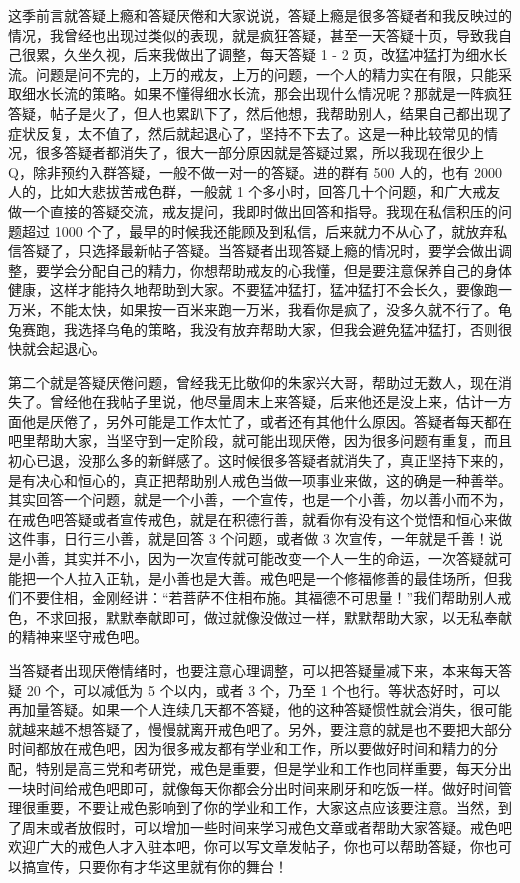 \documentclass{ctexart}
\begin{document}
这季前言就答疑上瘾和答疑厌倦和大家说说，答疑上瘾是很多答疑者和我反映过的情况，我曾经也出现过类似的表现，就是疯狂答疑，甚至一天答疑十页，导致我自己很累，久坐久视，后来我做出了调整，每天答疑 1 - 2 页，改猛冲猛打为细水长流。问题是问不完的，上万的戒友，上万的问题，一个人的精力实在有限，只能采取细水长流的策略。如果不懂得细水长流，那会出现什么情况呢？那就是一阵疯狂答疑，帖子是火了，但人也累趴下了，然后他想，我帮助别人，结果自己都出现了症状反复，太不值了，然后就起退心了，坚持不下去了。这是一种比较常见的情况，很多答疑者都消失了，很大一部分原因就是答疑过累，所以我现在很少上 Q，除非预约入群答疑，一般不做一对一的答疑。进的群有 500 人的，也有 2000 人的，比如大悲拔苦戒色群，一般就 1 个多小时，回答几十个问题，和广大戒友做一个直接的答疑交流，戒友提问，我即时做出回答和指导。我现在私信积压的问题超过 1000 个了，最早的时候我还能顾及到私信，后来就力不从心了，就放弃私信答疑了，只选择最新帖子答疑。当答疑者出现答疑上瘾的情况时，要学会做出调整，要学会分配自己的精力，你想帮助戒友的心我懂，但是要注意保养自己的身体健康，这样才能持久地帮助到大家。不要猛冲猛打，猛冲猛打不会长久，要像跑一万米，不能太快，如果按一百米来跑一万米，我看你是疯了，没多久就不行了。龟兔赛跑，我选择乌龟的策略，我没有放弃帮助大家，但我会避免猛冲猛打，否则很快就会起退心。

第二个就是答疑厌倦问题，曾经我无比敬仰的朱家兴大哥，帮助过无数人，现在消失了。曾经他在我帖子里说，他尽量周末上来答疑，后来他还是没上来，估计一方面他是厌倦了，另外可能是工作太忙了，或者还有其他什么原因。答疑者每天都在吧里帮助大家，当坚守到一定阶段，就可能出现厌倦，因为很多问题有重复，而且初心已退，没那么多的新鲜感了。这时候很多答疑者就消失了，真正坚持下来的，是有决心和恒心的，真正把帮助别人戒色当做一项事业来做，这的确是一种善举。其实回答一个问题，就是一个小善，一个宣传，也是一个小善，勿以善小而不为，在戒色吧答疑或者宣传戒色，就是在积德行善，就看你有没有这个觉悟和恒心来做这件事，日行三小善，就是回答 3 个问题，或者做 3 次宣传，一年就是千善！说是小善，其实并不小，因为一次宣传就可能改变一个人一生的命运，一次答疑就可能把一个人拉入正轨，是小善也是大善。戒色吧是一个修福修善的最佳场所，但我们不要住相，金刚经讲：“若菩萨不住相布施。其福德不可思量！”我们帮助别人戒色，不求回报，默默奉献即可，做过就像没做过一样，默默帮助大家，以无私奉献的精神来坚守戒色吧。

当答疑者出现厌倦情绪时，也要注意心理调整，可以把答疑量减下来，本来每天答疑 20 个，可以减低为 5 个以内，或者 3 个，乃至 1 个也行。等状态好时，可以再加量答疑。如果一个人连续几天都不答疑，他的这种答疑惯性就会消失，很可能就越来越不想答疑了，慢慢就离开戒色吧了。另外，要注意的就是也不要把大部分时间都放在戒色吧，因为很多戒友都有学业和工作，所以要做好时间和精力的分配，特别是高三党和考研党，戒色是重要，但是学业和工作也同样重要，每天分出一块时间给戒色吧即可，就像每天你都会分出时间来刷牙和吃饭一样。做好时间管理很重要，不要让戒色影响到了你的学业和工作，大家这点应该要注意。当然，到了周末或者放假时，可以增加一些时间来学习戒色文章或者帮助大家答疑。戒色吧欢迎广大的戒色人才入驻本吧，你可以写文章发帖子，你也可以帮助答疑，你也可以搞宣传，只要你有才华这里就有你的舞台！
\end{document}

